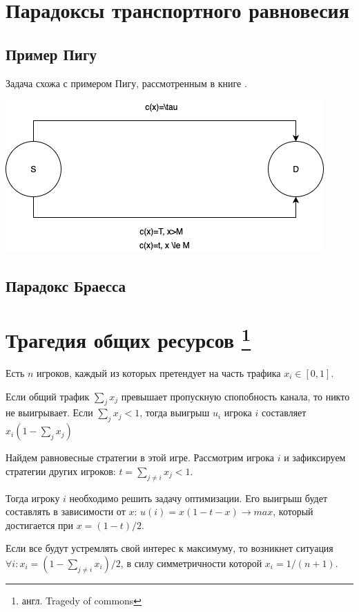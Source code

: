 \section{Парадоксы транспортного равновесия}
\subsection{Пример Пигу}\cite[447]{agt2007}
Задача схожа с примером Пигу, рассмотренным в книге \cite{agt2007}.

\includegraphics[scale=.7]{img/pigou}


\subsection{Парадокс Браесса}\cite[65]{gas}

\section{Трагедия общих ресурсов \footnote{англ. Tragedy of commons}}

Есть $n$ игроков, каждый из которых претендует на часть трафика $x_i\in[0,1]$.

Если общий трафик $\sum_j x_j$ превышает пропускную спопобность канала, то никто не выигрывает.
Если
$\sum_j x_j < 1$,
тогда выигрыш $u_i$ игрока 
$i$ составляет $x_i(1-\sum_j x_j)$

Найдем равновесные стратегии в этой игре.
Рассмотрим игрока $i$ и зафиксируем стратегии других игроков: $t=\sum_{j\ne i} x_j<1$.

Тогда игроку $i$ необходимо решить задачу оптимизации. 
Его выигрыш будет составлять в зависимости от $x$:
$u(i)=x(1-t-x)\to max$, который достигается при $x=(1-t)/2$.

Если все будут устремлять свой интерес к максимуму, то возникнет ситуация $\forall i: x_i=(1-\sum_{j\ne i} x_i)/2$, в силу симметричности которой $x_i=1/(n+1)$.

